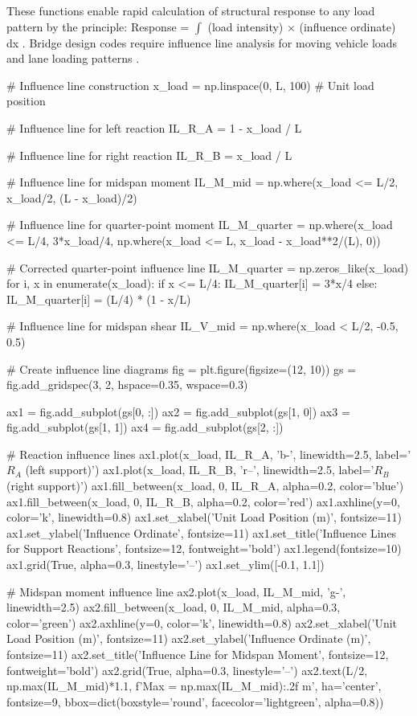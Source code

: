 \documentclass[11pt,a4paper]{article}
\begin{document}
These functions enable rapid calculation of structural response to any load pattern by the principle: Response = $\int$ (load intensity) $\times$ (influence ordinate) dx \cite{kassimali2011structural}. Bridge design codes require influence line analysis for moving vehicle loads and lane loading patterns \cite{aashto2017bridge}.

\begin{pycode}
# Influence line construction
x_load = np.linspace(0, L, 100)  # Unit load position

# Influence line for left reaction
IL_R_A = 1 - x_load / L

# Influence line for right reaction
IL_R_B = x_load / L

# Influence line for midspan moment
IL_M_mid = np.where(x_load <= L/2, x_load/2, (L - x_load)/2)

# Influence line for quarter-point moment
IL_M_quarter = np.where(x_load <= L/4,
                         3*x_load/4,
                         np.where(x_load <= L,
                                  x_load - x_load**2/(L),
                                  0))

# Corrected quarter-point influence line
IL_M_quarter = np.zeros_like(x_load)
for i, x in enumerate(x_load):
    if x <= L/4:
        IL_M_quarter[i] = 3*x/4
    else:
        IL_M_quarter[i] = (L/4) * (1 - x/L)

# Influence line for midspan shear
IL_V_mid = np.where(x_load < L/2, -0.5, 0.5)

# Create influence line diagrams
fig = plt.figure(figsize=(12, 10))
gs = fig.add_gridspec(3, 2, hspace=0.35, wspace=0.3)

ax1 = fig.add_subplot(gs[0, :])
ax2 = fig.add_subplot(gs[1, 0])
ax3 = fig.add_subplot(gs[1, 1])
ax4 = fig.add_subplot(gs[2, :])

# Reaction influence lines
ax1.plot(x_load, IL_R_A, 'b-', linewidth=2.5, label='$R_A$ (left support)')
ax1.plot(x_load, IL_R_B, 'r--', linewidth=2.5, label='$R_B$ (right support)')
ax1.fill_between(x_load, 0, IL_R_A, alpha=0.2, color='blue')
ax1.fill_between(x_load, 0, IL_R_B, alpha=0.2, color='red')
ax1.axhline(y=0, color='k', linewidth=0.8)
ax1.set_xlabel('Unit Load Position (m)', fontsize=11)
ax1.set_ylabel('Influence Ordinate', fontsize=11)
ax1.set_title('Influence Lines for Support Reactions', fontsize=12, fontweight='bold')
ax1.legend(fontsize=10)
ax1.grid(True, alpha=0.3, linestyle='--')
ax1.set_ylim([-0.1, 1.1])

# Midspan moment influence line
ax2.plot(x_load, IL_M_mid, 'g-', linewidth=2.5)
ax2.fill_between(x_load, 0, IL_M_mid, alpha=0.3, color='green')
ax2.axhline(y=0, color='k', linewidth=0.8)
ax2.set_xlabel('Unit Load Position (m)', fontsize=11)
ax2.set_ylabel('Influence Ordinate (m)', fontsize=11)
ax2.set_title('Influence Line for Midspan Moment', fontsize=12, fontweight='bold')
ax2.grid(True, alpha=0.3, linestyle='--')
ax2.text(L/2, np.max(IL_M_mid)*1.1, f'Max = {np.max(IL_M_mid):.2f} m',
         ha='center', fontsize=9, bbox=dict(boxstyle='round', facecolor='lightgreen', alpha=0.8))


\end{pycode}
\end{document}
